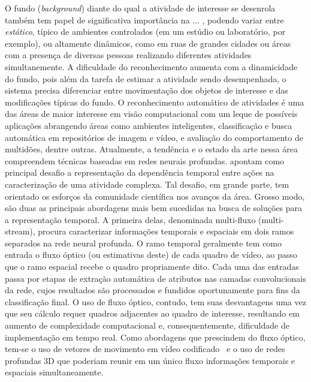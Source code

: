 O fundo (\emph{background}) diante do qual a atividade de interesse se desenrola também tem papel de significativa importância na ... , podendo variar entre \emph{estático}, típico de ambientes controlados (em um estúdio ou laboratório, por exemplo), ou altamente dinâmicos, como em ruas de grandes cidades ou áreas com a presença de diversas pessoas realizando diferentes atividades simultanemente. A dificuldade do reconhecimento aumenta com a dinamicidade do fundo, pois além da tarefa de estimar a atividade sendo desempenhada, o sistema precisa diferenciar entre movimentação dos objetos de interesse e das modificações típicas do fundo.
O reconhecimento automático de atividades é uma das áreas de maior interesse em visão computacional com um leque de possíveis aplicações abrangendo áreas como ambientes inteligentes, classificação e busca automática em repositórios de imagem e vídeo, e avaliação do comportamento de multidões, dentre outras.
%
%
%
Atualmente, a tendência e o estado da arte nessa área compreendem técnicas baseadas em redes neurais profundas. \textcite{yao-2019} apontam como principal desafio a representação da dependência temporal entre ações na caracterização de uma atividade complexa. Tal desafio, em grande parte, tem orientado os esforços da comunidade científica nos avanços da área. 
%
Grosso modo, são duas as principais abordagens mais bem sucedidas na busca de soluções para a representação temporal. A primeira delas, denominada multi-fluxo (multi-stream), procura caracterizar informações temporais e espaciais em dois ramos separados na rede neural profunda. O ramo temporal geralmente tem como entrada o fluxo óptico (ou estimativas deste) de cada quadro de vídeo, ao passo que o ramo espacial recebe o quadro propriamente dito. Cada uma das entradas passa por etapas de extração automática de atributos nas camadas convolucionais da rede, cujos resultados são processados e fundidos oportunamente para fins da classificação final. O uso de fluxo óptico, contudo, tem suas desvantagens uma vez que seu cálculo requer quadros adjacentes ao quadro de interesse, resultando em aumento de complexidade computacional e, consequentemente, dificuldade de implementação em tempo real. Como abordagens que prescindem do fluxo óptico, tem-se o uso de vetores de movimento em vídeo codificado~\parencite{yao-2019} e o uso de redes profundas 3D que poderiam reunir em um único fluxo informações temporais e espaciais simultaneamente. 

